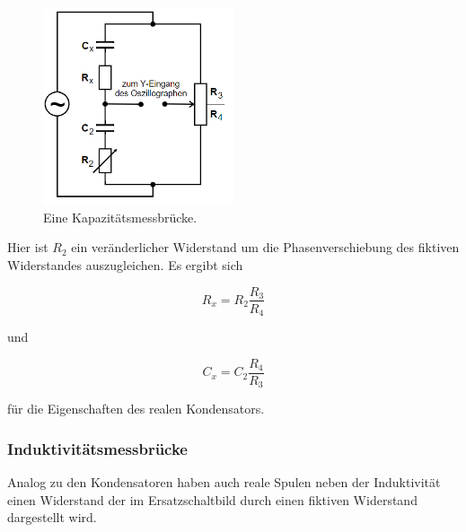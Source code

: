             \begin{figure}[ht]
                \centering
                \includegraphics[width=0.5\textwidth]{latex/images/Kondensator.PNG}
                \caption{Eine Kapazitätsmessbrücke\protect \cite{V302}.}
                \label{img:Kapa}
            \end{figure}

            \noindent Hier ist $R_2$ ein veränderlicher Widerstand um die Phasenverschiebung des fiktiven Widerstandes auszugleichen. 
            Es ergibt sich 

            \begin{equation*}
                R_x = R_2 \frac{R_3}{R_4}
            \end{equation*}

            \noindent und 

            \begin{equation*}
                C_x = C_2 \frac{R_4}{R_3}
            \end{equation*}

            \noindent für die Eigenschaften des realen Kondensators.

        \subsubsection{Induktivitätsmessbrücke}

            \noindent Analog zu den Kondensatoren haben auch reale Spulen neben der Induktivität einen Widerstand der im Ersatzschaltbild durch 
            einen fiktiven Widerstand dargestellt wird. 

